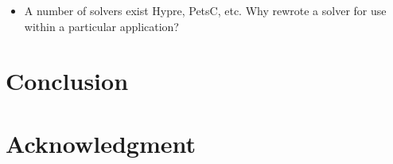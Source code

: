 \documentclass[conference]{IEEEtran}
\begin{document}
\begin{itemize}
\item A number of solvers exist Hypre, PetsC, etc.   Why rewrote a solver for use within a particular application?
\end{itemize}

\section{Conclusion}




\section*{Acknowledgment}




\end{document}
